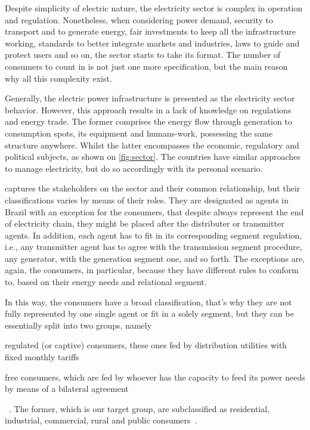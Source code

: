 Despite simplicity of electric nature, the electricity sector is complex in operation and regulation.
Nonetheless, when considering power demand, security to transport and to generate energy, fair investments to keep all the infrastructure working, standards to better integrate markets and industries, laws to guide and protect users and so on, the sector starts to take its format.
The number of consumers to count in is not just one more specification, but the main reason why all this complexity exist.


Generally, the electric power infrastructure is presented as the electricity sector behavior.
However, this approach results in a lack of knowledge on regulations and energy trade.
The former comprises the energy flow through generation to consumption spots, its equipment and humans-work, possessing the same structure anywhere.
Whilst the latter encompasses the economic, regulatory and political subjects, as shown on \autoref{fig:sector}.
The countries have similar approaches to manage electricity, but do so accordingly with its personal scenario.



 captures the stakeholders on the sector and their common relationship, but their classifications varies by means of their roles.
They are designated as agents in Brazil with an exception for the consumers, that despite always represent the end of electricity chain, they might be placed after the distributer or transmitter agents.
In addition, each agent has to fit in its corresponding segment regulation, i.e.,
any transmitter agent has to agree with the transmission segment procedure,
any generator, with the generation segment one, and so forth.
The exceptions are, again, the consumers, in particular, because they have different rules to conform to, based on their energy needs and relational segment.

In this way, the consumers have a broad classification, that's why they are not fully represented by one single agent or fit in a solely segment, but they can be essentially split into two groups, namely
\begin{enumerate*}[label={{(\roman*)}},itemjoin={{; }},itemjoin*={{; and }}]
    \item regulated (or captive) consumers, these ones fed by distribution utilities with fixed monthly tariffs
    \item free consumers, which are fed by whoever has the capacity to feed its power needs by means of a bilateral agreement
\end{enumerate*}
~\cite{agentes,lud2007}.
The former, which is our target group, are subclassified as residential, industrial, commercial, rural and public consumers~\cite{tarifas}.

